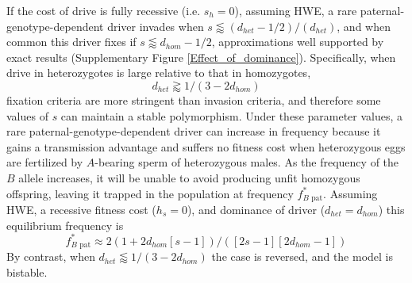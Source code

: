 \documentclass[12pt,letterpaper]{article}
\begin{document}
If the cost of drive is fully recessive (i.e. $s_h=0$), assuming HWE, 
	a rare paternal-genotype-dependent driver invades when 
	$s\lessapprox (d_{het}-1/2)/(d_{het})$, and when common this driver fixes if 
	$s\lessapprox d_{hom}-1/2$, approximations well supported by exact results (Supplementary Figure \ref{Effect_of_dominance}).
Specifically, when drive in heterozygotes is large relative to that in homozygotes, 
	\begin{equation} d_{het}  \gtrapprox 1/(3-2d_{hom}) \label{polymale} \end{equation}
	fixation criteria are more stringent than invasion criteria, 
	and therefore some values of $s$ can maintain a stable polymorphism. 
Under these parameter values, a rare paternal-genotype-dependent driver 
	can increase in frequency because it gains a transmission advantage and suffers 
	no fitness cost when heterozygous eggs are fertilized by 
	$A$-bearing sperm of heterozygous males. 
As the frequency of the $B$ allele increases, 
	it will be unable to 
	avoid producing unfit homozygous offspring, leaving it trapped in
	the population at frequency $f_{B\text{ pat}}^*$. 
Assuming HWE, a recessive fitness cost ($h_s=0$), and dominance of driver ($d_{het}=d_{hom}$) this equilibrium frequency is
\begin{equation}f_{B\text{ pat}}^*\approx2 (1 + 2d_{hom}[s - 1])/([2 s - 1][2d_{hom}- 1]) \label{eqmale} \end{equation}
By contrast, when $d_{het} \lessapprox 1/(3-2d_{hom})$ the case is reversed, and the model is bistable.
\end{document}
